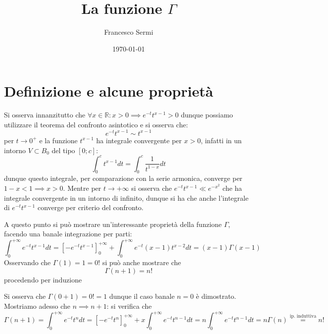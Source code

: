 \documentclass{report}
\title{La funzione $\Gamma$}
\author{Francesco Sermi}
\date{\today}
\begin{document}
	\maketitle
	\pagebreak
	\chapter{Definizione e alcune proprietà}
	\begin{myproof}
	Si osserva innanzitutto che $\forall x \in \mathbb{R}: x>0 \implies e^{-t} t^{x-1} > 0$ dunque possiamo utilizzare il teorema del confronto asintotico e si osserva che:
	$$e^{-t} t^{x-1} \sim t^{x-1}$$ per $t \to 0^{+}$ e la funzione $t^{x-1}$ ha integrale convergente per $x > 0$, infatti in un intorno $V \subset \mathit{B}_0$ del tipo $[0; c]$:
	$$
		\int_{0}^{c} t^{x-1}dt = \int_{0}^c \frac{1}{t^{1-x}} dt
	$$
	dunque questo integrale, per comparazione con la serie armonica, converge per $1-x< 1 \implies x > 0$. Mentre per $t \to +\infty$ si osserva che $e^{-t} t^{x-1} \ll e^{-x^2}$ che ha integrale convergente in un intorno di infinito, dunque si ha che anche l'integrale di $e^{-t} t^{x-1}$ converge per criterio del confronto. \\
	\end{myproof}
	\noindent A questo punto si può mostrare un'interessante proprietà della funzione $\Gamma$, facendo una banale integrazione per parti:
	$$
		\int_{0}^{+\infty} e^{-t} t^{x-1} dt = [-e^{-t} t^{x-1}]_{0}^{+\infty} + \int_{0}^{+\infty} e^{-t} (x-1)t^{x-2}dt = (x-1)\Gamma (x-1) 
	$$
	Osservando che $\Gamma(1) = 1 = 0!$ si può anche mostrare che
	$$
		\Gamma(n+1) = n!
	$$
	procedendo per induzione
	\begin{myproof}
		Si osserva che $\Gamma(0 + 1) = 0! = 1$ dunque il caso banale $n=0$ è dimostrato. Mostriamo adesso che $n \implies n+1$: si verifica che $$\Gamma(n+1) = \int_{0}^{+\infty} e^{-t} t^ndt = \left[-e^{-t} t^n \right]_{0}^{+\infty} + x\int_{0}^{+\infty} e^{-t}t^{n-1}dt = n \int_{0}^{+\infty} e^{-t} t^{n-1}dt = n\Gamma(n) \stackrel{\text{ip. induttiva}}{=} n! $$
	\end{myproof}
\end{document}
